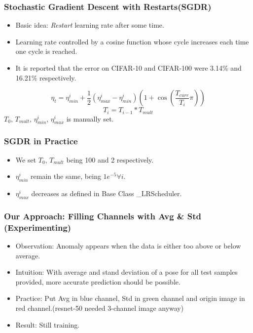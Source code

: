 \documentclass{beamer}
\begin{document}
\begin{frame}
\frametitle{Stochastic Gradient Descent with Restarts(SGDR) \cite{SGDR}}

	\begin{itemize}
		\item Basic idea: \textit{Restart} learning rate after some time.
		\item Learning rate controlled by a cosine function whose cycle increases each time one cycle is reached. 
		\item It is reported that the error on CIFAR-10 and CIFAR-100 were 3.14\% and 16.21\% respectively\cite{SGDR}.
	\end{itemize}
	$$ \eta_t = \eta_{min}^i + \frac{1}{2}(\eta_{max}^i-\eta_{min}^i)(1 + \cos(\frac{T_{curr}}{T_i}\pi))$$
	$$ T_{i} = T_{i-1} * T_{mult} $$
	$T_0$, $T_{mult}$, $\eta_{min}^i$, $\eta_{max}^i$ is manually set.
\end{frame}

\begin{frame}
\frametitle{SGDR in Practice}

	\begin{itemize}
		\item We set $T_0$, $T_{mult}$ being 100 and 2 respectively.
		\item $\eta_{min}^i$ remain the same, being $1e^{-5} \forall i$.
		\item $\eta_{max}^i$ decreases as defined in Base Class \_LRScheduler.
	\end{itemize}

\end{frame}

\begin{frame}
\frametitle{Our Approach: Filling Channels with Avg \& Std (Experimenting)}

	\begin{itemize}
		\item Observation: Anomaly appears when the data is either too above or below average.
		\item Intuition: With average and stand deviation of a pose for all test samples provided, more accurate prediction should be possible.
		\item Practice: Put Avg in blue channel, Std in green channel and origin image in red channel.(resnet-50 needed 3-channel image anyway)
		\item Result: Still training.
	\end{itemize}

\end{frame}
\end{document}
